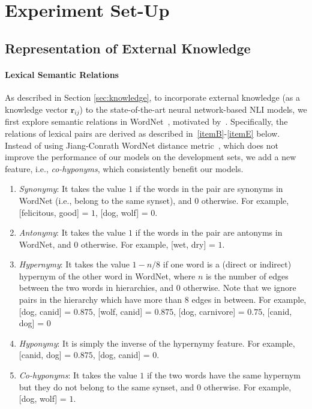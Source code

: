 \documentclass[11pt,a4paper]{article}
\newcommand{\vect}[1]{\bm{#1}}
\begin{document}
\section{Experiment Set-Up}
\label{sec:setup}
\subsection{Representation of External Knowledge}
\paragraph{Lexical Semantic Relations} As described in Section \ref{sec:knowledge}, to incorporate external knowledge (as a knowledge vector ${\vect r}_{ij}$) to the state-of-the-art neural network-based NLI models, we first explore semantic relations in WordNet~\citep{DBLP:journals/cacm/Miller95}, motivated by~\citet{MacCartneyThesis}. Specifically, the relations of lexical pairs are derived as described in~\ref{itemB}-\ref{itemE} below. Instead of using Jiang-Conrath WordNet distance metric~\citep{DBLP:conf/rocling/JiangC97}, which does not improve the performance of our models on the development sets, we add a new feature, i.e., \textit{co-hyponyms}, which consistently benefit  our models. 

\begin{enumerate}[(1)]
\itemsep 0em
\item \label{itemB} \textit{Synonymy}: It takes the value $1$ if the words in the pair are synonyms in WordNet (i.e., belong to the same synset), and $0$ otherwise. For example, [felicitous, good] = $1$, [dog, wolf] = $0$. 
\item \textit{Antonymy}: It takes the value $1$ if the words in the pair are antonyms in WordNet, and $0$ otherwise. For example, [wet, dry] = $1$. 
\item \textit{Hypernymy}: It takes the value $1-n/8$ if one word is a (direct or indirect) hypernym of the other word in WordNet, where $n$ is the number of edges between the two words in hierarchies, and $0$ otherwise. Note that we ignore pairs in the hierarchy which have more than 8 edges in between. For example, [dog, canid] = $0.875$, [wolf, canid] = $0.875$, [dog, carnivore] = $0.75$, [canid, dog] = $0$
\item \label{itemE} \textit{Hyponymy}: It is simply the inverse of the hypernymy feature.
For example, [canid, dog] = $0.875$, [dog, canid] = $0$.
\item  \textit{Co-hyponyms}: It takes the value $1$ if the two words have the same hypernym but they do not belong to the same synset, and $0$ otherwise. For example, [dog, wolf] = $1$.
\end{enumerate}
\end{document}
